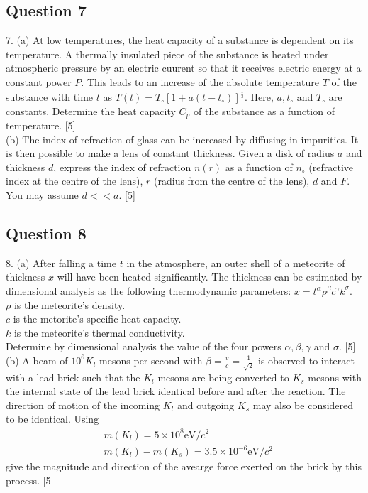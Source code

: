 \documentclass{article}
\begin{document}
\subsection{Question 7}
7. (a) At low temperatures, the heat capacity of a substance is dependent on its temperature. A thermally insulated piece of the substance is heated under atmospheric pressure by an electric cuurent so that it receives electric energy at a constant power $P$. This leads to an increase of the absolute temperature $T$ of the substance with time $t$ as $T(t)=T_{\circ}\left[1+a\left(t-t_{\circ}\right)\right]^{\frac{1}{3}}$. Here, $a, t_{\circ}$ and $T_{\circ}$ are constants. Determine the heat capacity $C_{p}$ of the substance as a function of temperature. [5] \\
(b) The index of refraction of glass can be increased by diffusing in impurities. It is then possible to make a lens of constant thickness. Given a disk of radius $a$ and thickness $d$, express the index of refraction $n(r)$ as a function of $n_{\circ}$ (refractive index at the centre of the lens), $r$ (radius from the centre of the lens), $d$ and $F$. You may assume $d<<a$. [5]

\subsection{Question 8}
8. (a) After falling a time $t$ in the atmosphere, an outer shell of a meteorite of thickness $x$ will have been heated significantly. The thickness can be estimated by dimensional analysis as the following thermodynamic parameters: $x=t^{\alpha} \rho^{\beta} c^{\gamma} k^{\sigma}$. \\
$\rho$ is the meteorite's density. \\
$c$ is the metorite's specific heat capacity. \\
$k$ is the meteorite's thermal conductivity. \\
Determine by dimensional analysis the value of the four powers $\alpha, \beta, \gamma$ and $\sigma$. [5] \\
(b) A beam of $10^{6} K_{l}$ mesons per second with $\beta=\frac{v}{c}=\frac{1}{\sqrt{2}}$ is observed to interact with a lead brick such that the $K_{l}$ mesons are being converted to $K_{s}$ mesons with the internal state of the lead brick identical before and after the reaction. The direction of motion of the incoming $K_{l}$ and outgoing $K_{s}$ may also be considered to be identical. Using
$$
\begin{aligned}
	&m\left(K_{l}\right)=5 \times 10^{8} \mathrm{eV} / c^{2} \\
	&m\left(K_{l}\right)-m\left(K_{s}\right)=3.5 \times 10^{-6} \mathrm{eV} / c^{2}
\end{aligned}
$$
give the magnitude and direction of the avearge force exerted on the brick by this process. [5] 
\end{document}

